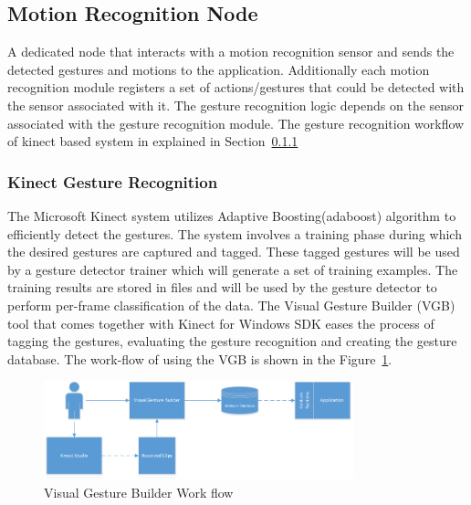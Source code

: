 \subsection{Motion Recognition Node} A dedicated node that interacts with a motion recognition sensor and sends the detected gestures and motions to the application. Additionally each motion recognition module registers a set of actions/gestures that could be detected with the sensor associated with it. The gesture recognition logic depends on the sensor associated with the gesture recognition module. The gesture recognition workflow of kinect based system in explained in Section~\ref{sssec:kinect_gestures}
\subsubsection{Kinect Gesture Recognition}
\label{sssec:kinect_gestures}
	The Microsoft Kinect system utilizes Adaptive Boosting(adaboost) algorithm \cite{freund1997decision} to efficiently detect the gestures. The system involves a training phase during which the desired gestures are captured and tagged. These tagged gestures will be used by a gesture detector trainer which will generate a set of training examples. The training results are stored in files and will be used by the gesture detector to perform per-frame classification of the data. The Visual Gesture Builder (VGB) tool that comes together with Kinect for Windows SDK eases the process of tagging the gestures, evaluating the gesture recognition and creating the gesture database. The work-flow of using the VGB is shown in the Figure~\ref{fig:vgb_workflow}.
\begin{figure}[H]
\centering
\includegraphics[width=0.8\textwidth]{assets/VisualGestureBuilder.png}
\caption[Visual Gesture Builder Work flow]{Visual Gesture Builder Work flow \cite{KinectSDK2014}}
\label{fig:vgb_workflow}
\end{figure}
